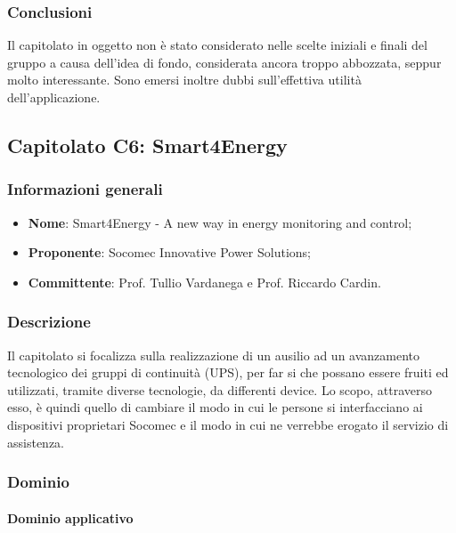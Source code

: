 \documentclass[11pt]{article}
\begin{document}
    \subsubsection{Conclusioni}
    Il capitolato in oggetto non è stato considerato nelle scelte iniziali e finali del gruppo a causa dell'idea di fondo, considerata
    ancora troppo abbozzata, seppur molto interessante. Sono emersi inoltre dubbi sull'effettiva utilità dell'applicazione.

\newpage




\subsection{Capitolato C6: Smart4Energy}

    \subsubsection{Informazioni generali}
    \begin{itemize}
        \item \textbf{Nome}: Smart4Energy - A new way in energy monitoring and control;
        \item \textbf{Proponente}: Socomec Innovative Power Solutions;
        \item \textbf{Committente}: Prof. Tullio Vardanega e Prof. Riccardo Cardin.
    \end{itemize}
    
    \subsubsection{Descrizione}
    Il capitolato si focalizza sulla realizzazione di un ausilio ad un avanzamento tecnologico dei gruppi di continuità (UPS), per far si
    che possano essere fruiti ed utilizzati, tramite diverse tecnologie, da differenti device. Lo scopo, attraverso esso, è quindi quello
    di cambiare il modo in cui le persone si interfacciano ai dispositivi proprietari Socomec e il modo in cui ne verrebbe erogato il
    servizio di assistenza.
    
    \subsubsection{Dominio}
        \paragraph{Dominio applicativo}~\\
        
\end{document}
